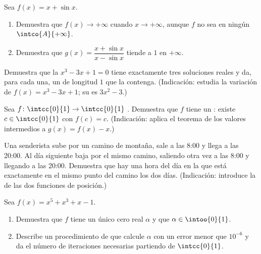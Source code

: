 \begin{exercise}[$\star\star$]\label{exo:g12:limcont:5}
Sea $f(x) = x + \sin x$.
\begin{enumerate}
  \item Demuestra que $f(x) \to +\infty$ cuando $x \to +\infty$, aunque $f$
        no sea  en ningún  $\intco{A}{+\infty}$.
  \item Demuestra que $g(x) = \dfrac{x + \sin x}{x - \sin x}$ tiende a $1$
        en $+\infty$.
\end{enumerate}
\end{exercise}

\begin{exercise}[$\star\star$]\label{exo:g12:limcont:6}
Demuestra que la  $x^3 - 3x + 1 = 0$ tiene exactamente tres
soluciones reales y da, para cada una, un  de longitud $1$ que la
contenga. (Indicación: estudia la variación de $f(x) = x^3 - 3x + 1$; su
 es $3x^2 - 3$.)
\end{exercise}

\begin{exercise}[$\star\star$]\label{exo:g12:limcont:7}
Sea $f \colon \intcc{0}{1} \to \intcc{0}{1}$ . Demuestra que $f$
tiene un \emph{}: existe $c \in \intcc{0}{1}$ con $f(c) = c$.
(Indicación: aplica el teorema de los valores intermedios a
$g(x) = f(x) - x$.)
\end{exercise}

\begin{exercise}[$\star\star\star$]\label{exo:g12:limcont:8}
Una senderista sube por un camino de montaña, sale a las 8:00 y llega a las
20:00. Al día siguiente baja por el mismo camino, saliendo otra vez a las
8:00 y llegando a las 20:00. Demuestra que hay una hora del día en la que
está exactamente en el mismo punto del camino los dos días. (Indicación:
introduce la  de las dos funciones de posición.)
\end{exercise}

\begin{exercise}[$\star\star\star$]\label{exo:g12:limcont:9}
Sea $f(x) = x^5 + x^3 + x - 1$.
\begin{enumerate}
  \item Demuestra que $f$ tiene un único cero real $\alpha$ y que
        $\alpha \in \intoo{0}{1}$.
  \item Describe un procedimiento de  que calcule $\alpha$ con un
        error menor que $10^{-6}$ y da el número de iteraciones necesarias
        partiendo de $\intcc{0}{1}$.
\end{enumerate}
\end{exercise}

